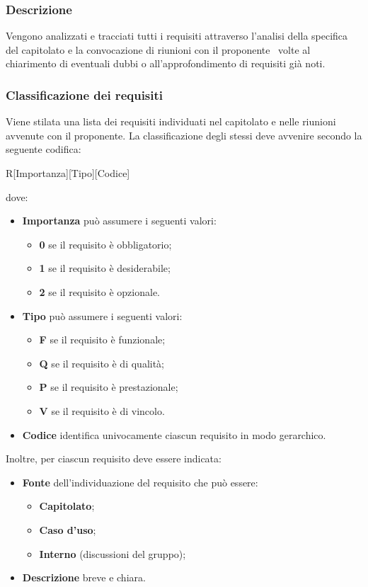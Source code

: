 \documentclass[../NormeDiProgetto.tex]{subfiles}
\begin{document}
			\subsubsection{Descrizione}
				Vengono analizzati e tracciati tutti i requisiti  attraverso l'analisi della specifica del capitolato e la convocazione di riunioni con il proponente \proponente\ volte al chiarimento di eventuali dubbi o all'approfondimento di requisiti già noti.
			\subsubsection{Classificazione dei requisiti}
				Viene stilata una lista dei requisiti individuati nel capitolato e nelle
				riunioni avvenute con il proponente. La classificazione
				degli stessi deve avvenire secondo la seguente codifica:
				\begin{center}
					R[Importanza][Tipo][Codice]
				\end{center}
				dove:
				\begin{itemize}
					\item \textbf{Importanza} può assumere i seguenti valori:
					\begin{itemize}
						\item \textbf{0} se il requisito è obbligatorio;
						\item \textbf{1} se il requisito è desiderabile;
						\item \textbf{2} se il requisito è opzionale.
					\end{itemize}
					\item \textbf{Tipo} può assumere i seguenti valori:
					\begin{itemize}
						\item \textbf{F} se il requisito è funzionale;
						\item \textbf{Q} se il requisito è di qualità;
						\item \textbf{P} se il requisito è prestazionale;
						\item \textbf{V} se il requisito è di vincolo.
					\end{itemize}
					\item \textbf{Codice} identifica univocamente
					ciascun requisito in modo gerarchico.
				\end{itemize}
				Inoltre, per ciascun requisito deve essere indicata:
				\begin{itemize}
					\item \textbf{Fonte} dell'individuazione del requisito che può essere:
					\begin{itemize}
						\item \textbf{Capitolato};
						\item \textbf{Caso d'uso};
						\item \textbf{Interno} (discussioni del gruppo);
					\end{itemize}
					\item \textbf{Descrizione} breve e chiara.
				\end{itemize}
\end{document}
